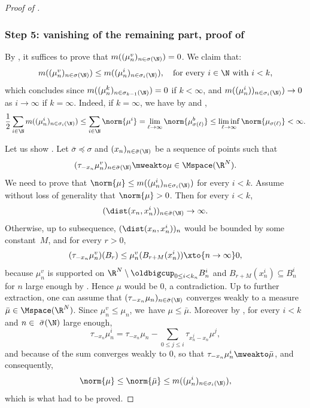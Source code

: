 \begin{proof}[Proof of ]
\subsubsection*{Step 5: vanishing of the remaining part, proof of }
By , it suffices to prove that \(m((\mu^v_n)_{n\in\sigma(\N)})=0\). We claim that:
\begin{equation}\label{bubbleConcentrationEstimate}
m((\mu^v_n)_{n\in\sigma(\N)})\le m((\mu^i_n)_{n\in\sigma_i(\N)}),\quad\text{for every \(i\in\N\) with \(i< k\)},
\end{equation}
which concludes since \(m((\mu^k_n)_{n\in\sigma_{k-1}(\N)})=0\) if \(k<\infty\), and \(m((\mu^i_n))_{n\in\sigma_i(\N)})\to 0\) as \(i\to\infty\) if \(k=\infty\). Indeed, if \(k=\infty\), we have by  and ,
\[
\frac 12\sum_{i\in\N}m((\mu^i_n)_{n\in\sigma_i(\N)})\le\sum_{i\in\N}\norm{\mu^i}= \lim_{\ell\to\infty} \norm{\mu_{\sigma(\ell)}^b} \leq \liminf_{\ell\to\infty}\norm{\mu_{\sigma(\ell)}}<\infty.
\]

Let us show . Let \(\bar\sigma\preceq\sigma\) and \((x_n)_{n\in\bar\sigma(\N)}\) be a sequence of points such that
\[
(\tau_{-x_n}\mu^v_n)_{n\in\bar\sigma(\N)}\mweakto \mu\in\Mspace(\R^N).
\]
We need to prove that \(\norm{\mu}\le m((\mu^i_n)_{n\in \sigma_i(\N)})\) for every $i <k$. Assume without loss of generality that \(\norm{\mu}>0\). Then for every \(i<k\),
\begin{equation}\label{distanceDiverge}
(\dist(x_n,x^i_n))_{n\in\bar\sigma(\N)}\to\infty.
\end{equation}
Otherwise, up to subsequence, $(\dist(x_n,x_n^i))_n$ would be bounded by some constant~$M$, and for every $r > 0$,
\[(\tau_{-x_n} \mu_n^v)(B_r) \leq \mu_n^v(B_{r+M}(x^i_n)) \xto{n\to\infty} 0,\]
because \(\mu^v_n\) is supported on \(\R^N\setminus\oldbigcup_{0\le i<k_n}B^i_n\) and $B_{r+M}(x^i_n) \subseteq B^i_n$ for $n$ large enough by . Hence \(\mu\) would be \(0\), a contradiction. Up to further extraction, one can assume that \((\tau_{-x_n}\mu_n)_{n\in\bar\sigma(\N)}\) converges weakly to a measure \(\bar\mu \in \Mspace(\R^N)\). Since \(\mu^v_n\le\mu_n\), we~have \(\mu\le\bar\mu\). Moreover by , for every \(i < k\) and \(n\in\ \bar\sigma(\N)\) large enough,
\[
\tau_{-x_n}\mu^i_n=\tau_{-x_n}\mu_n-\sum_{0\le j\leq i}\tau_{x^j_n-x_n}\mu^j,
\]
and because of  the sum converges weakly to $0$, so that $\tau_{-x_n} \mu_n^i \mweakto \bar \mu$, and consequently,
\[
\norm{\mu}\le\norm{\bar\mu}\le m((\mu^i_n)_{n\in\sigma_i(\N)}),
\]
which is what had to be proved.


\end{proof}

